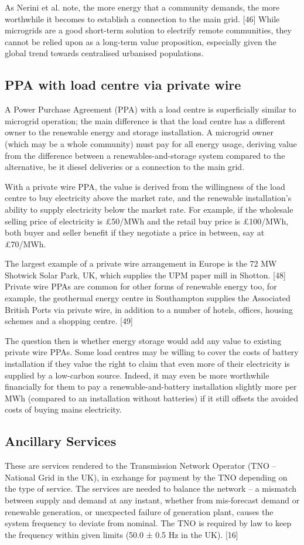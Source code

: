 \documentclass[report_18month.tex]{subfiles}
\begin{document}
As Nerini et al. note, the more energy that a community demands, the more worthwhile it becomes to establish a connection to the main grid. [46] While microgrids are a good short-term solution to electrify remote communities, they cannot be relied upon as a long-term value proposition, especially given the global trend towards centralised urbanised populations.
 
\subsection{PPA with load centre via private wire}
A Power Purchase Agreement (PPA) with a load centre is superficially similar to microgrid operation; the main difference is that the load centre has a different owner to the renewable energy and storage installation. A microgrid owner (which may be a whole community) must pay for all energy usage, deriving value from the difference between a renewables-and-storage system compared to the alternative, be it diesel deliveries or a connection to the main grid.

With a private wire PPA, the value is derived from the willingness of the load centre to buy electricity above the market rate, and the renewable installation’s ability to supply electricity below the market rate. For example, if the wholesale selling price of electricity is £50/MWh and the retail buy price is £100/MWh, both buyer and seller benefit if they negotiate a price in between, say at £70/MWh.

The largest example of a private wire arrangement in Europe is the 72 MW Shotwick Solar Park, UK, which supplies the UPM paper mill in Shotton. [48] Private wire PPAs are common for other forms of renewable energy too, for example, the geothermal energy centre in Southampton supplies the Associated British Ports via private wire, in addition to a number of hotels, offices, housing schemes and a shopping centre. [49]

The question then is whether energy storage would add any value to existing private wire PPAs. Some load centres may be willing to cover the costs of battery installation if they value the right to claim that even more of their electricity is supplied by a low-carbon source. Indeed, it may even be more worthwhile financially for them to pay a renewable-and-battery installation slightly more per MWh (compared to an installation without batteries) if it still offsets the avoided costs of buying mains electricity.

\subsection{Ancillary Services}
These are services rendered to the Transmission Network Operator (TNO – National Grid in the UK), in exchange for payment by the TNO depending on the type of service. The services are needed to balance the network – a mismatch between supply and demand at any instant, whether from mis-forecast demand or renewable generation, or unexpected failure of generation plant, causes the system frequency to deviate from nominal. The TNO is required by law to keep the frequency within given limits (50.0 ± 0.5 Hz in the UK). [16]
\end{document}
